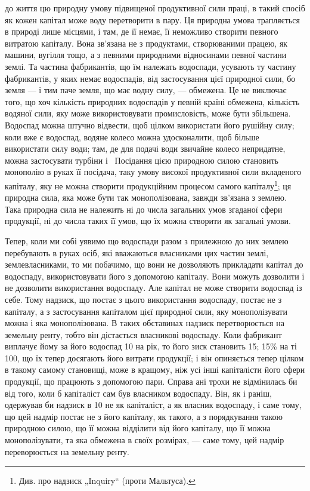 \parcont{}  %
до життя цю природну умову підвищеної продуктивної сили праці, в такий
спосіб як кожен капітал може воду перетворити в пару. Ця природна умова
трапляється в природі лише місцями, і там, де її немає, її неможливо створити
певного витратою капіталу. Вона зв’язана не з продуктами, створюваними працею,
як машини, вугілля тощо, а з певними природними відносинами певної частини
землі. Та частина фабрикантів, що їм належать водоспади, усувають ту частину
фабрикантів, у яких немає водоспадів, від застосування цієї природної сили,
бо земля — і тим паче земля, що має водну силу, — обмежена. Це не виключає
того, що хоч кількість природних водоспадів у певній країні обмежена, кількість
водяної сили, яку може використовувати промисловість, може бути збільшена.
Водоспад можна штучно відвести, щоб цілком використати його рушійну силу;
коли вже є водоспад, водяне колесо можна удосконалити, щоб більше використати
силу води; там, де для подачі води звичайне колесо непридатне, можна застосувати
турбіни і~ Посідання цією природною силою становить монополію
в руках її посідача, таку умову високої продуктивної сили вкладеного капіталу,
яку не можна створити продукційним процесом самого капіталу\footnote{
Див. про надзиск „Inquiry“ (проти Мальтуса).
}; ця природна
сила, яка може бути так монополізована, завжди зв’язана з землею. Така природна
сила не належить ні до числа загальних умов згаданої сфери продукції, ні до
числа таких її умов, що їх можна створити як загальні умови.

Тепер, коли ми собі уявимо що водоспади разом з прилежною до них землею
перебувають в руках осіб, які вважаються власниками цих частин землі,
землевласниками, то ми побачимо, що вони не дозволяють прикладати капітал
до водоспаду, використовувати його з допомогою капіталу. Вони можуть
дозволити і не дозволити використання водоспаду. Але капітал не може створити
водоспад із себе. Тому надзиск, що постає з цього використання водоспаду, постає
не з капіталу, а з застосування капіталом цієї природної сили, яку монополізувати
можна і яка монополізована. В таких обставинах надзиск перетворюється на земельну
ренту, тобто він дістається власникові водоспаду. Коли фабрикант виплачує
йому за його водоспад 10 на рік, то його зиск становить 15; 15\% на
ті 100, що їх тепер досягають його витрати продукції; і він опиняється
тепер цілком в такому самому становищі, може в кращому, ніж усі інші капіталісти
його сфери продукції, що працюють з допомогою пари. Справа ані трохи
не відмінилась би від того, коли б капіталіст сам був власником водоспаду. Він,
як і раніш, одержував би надзиск в 10 не як капіталіст, а як власник водоспаду,
і саме тому, що цей надмір постає не з його капіталу, як такого, а
з порядкування такою природною силою, що її можна відділити від його капіталу,
що її можна монополізувати, та яка обмежена в своїх розмірах, — саме тому, цей
надмір переворюється на земельну ренту.

